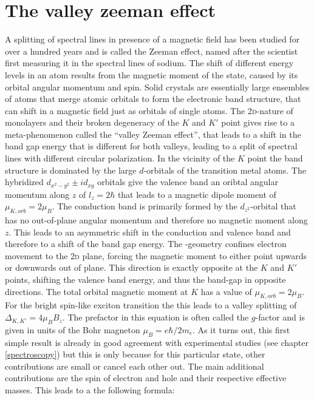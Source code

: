 \section{The valley zeeman effect}\label{zeeman}

A splitting of spectral lines in presence of a magnetic field has been studied for over a hundred years and is called the Zeeman effect, named after the scientist first measuring it in the spectral lines of sodium. The shift of different energy levels in an atom results from the magnetic moment of the state, caused by its orbital angular momentum and spin. Solid crystals are essentially large ensembles of atoms that merge atomic orbitals to form the electronic band structure, that can shift in a magnetic field just as orbitals of single atoms. The 2\textsc{d}-nature of \tmdg monolayers and their broken degeneracy of the $K$ and $K'$ point gives rise to a meta-phenomenon called the ``valley Zeeman effect'', that leads to a shift in the band gap energy that is different for both valleys, leading to a split of spectral lines with different circular polarization\cite{srivastava_valley_2015, aivazian_magnetic_2015}. In the vicinity of the $K$ point the band structure is dominated by the large $d$-orbitals of the transition metal atoms. The hybridized $d_{x^2-y^2} \pm id_{xy}$ orbitals give the valence band an oribtal angular momentum along $z$ of $l_z=2\hbar$ that leads to a magnetic dipole moment of $\mu_{K,orb}=2\mu_B$. The conduction band is primarily formed by the $d_{z^2}$-orbital that has no out-of-plane angular momentum and therefore no magnetic moment along $z$. This leads to an asymmetric shift in the conduction and valence band and therefore to a shift of the band gap energy. The \tmd-geometry confines electron movement to the 2\textsc{d} plane, forcing the magnetic moment to either point upwards or downwards out of plane. This direction is exactly opposite at the $K$ and $K'$ points, shifting the valence band energy, and thus the band-gap in opposite directions. The total orbital magnetic moment at $K$ has a value of $\mu_{K,orb}=2\mu_B$. For the bright spin-like exciton transition the this leads to a valley splitting of $\Delta_{K,K'}=4\mu_BB_z$. The prefactor in this equation is often called the $g$-factor and is given in units of the Bohr magneton $\mu_B=e\hbar/2m_e$. As it turns out, this first simple result is already in good agreement with experimental studies (see chapter \ref{spectroscopy}) but this is only because for this particular state, other contributions are small or cancel each other out. The main additional contributions are the spin of electron and hole and their respective effective masses. %
This leads to a the following formula:


